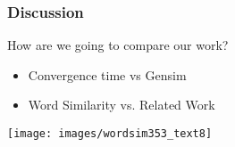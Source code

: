 \begin{frame}
\frametitle{Discussion}
How are we going to compare our work? 
\begin{itemize}
\item Convergence time vs Gensim
\item Word Similarity vs. Related Work
\end{itemize}

\texttt{[image: images/wordsim353\_text8]}
\end{frame}